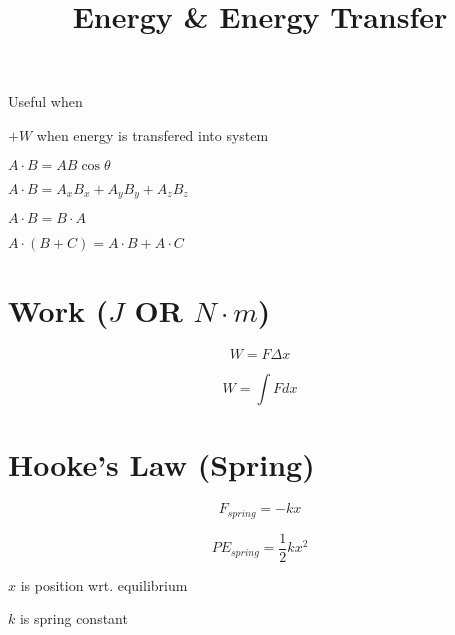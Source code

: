 \documentclass[12pt]{article}
\title{\textbf{Energy \& Energy Transfer}}
\date{}
\begin{document}
\maketitle

\begin{spacing}{1.5}

\begin{itemize*}
	\item Useful when \textbf{\color{red}{force is not constant}}
	\item $+W$ when energy is transfered into system
	\item $A \cdot B = A B \cos{\theta}$
		\begin{itemize*}
			\item $A \cdot B = A_x B_x + A_y B_y + A_z B_z$
			\item $A \cdot B = B \cdot A$
			\item $A \cdot (B + C) = A \cdot B + A \cdot C$
		\end{itemize*}
	\item \textbf{\color{red}{Work $\approx$ Energy}}
	\item \textbf{\color{red}{SI unit of Work \& Energy is $J$}}
\end{itemize*}

\section{Work ($J$ OR $N \cdot m$)}

\begin{equation}
	\boxed{W = F \Delta x}
\end{equation}

\begin{equation}
	\boxed{W = \int F {dx}}
\end{equation}

\section{Hooke's Law (Spring)}

\begin{equation}
	\boxed{F_{spring} = -kx}
\end{equation}

\begin{equation}
	\boxed{PE_{spring} = \frac{1}{2} kx^2}
\end{equation}

\begin{itemize*}
	\item $x$ is position wrt. equilibrium
	\item $k$ is spring constant
\end{itemize*}


\end{spacing}
\end{document}
